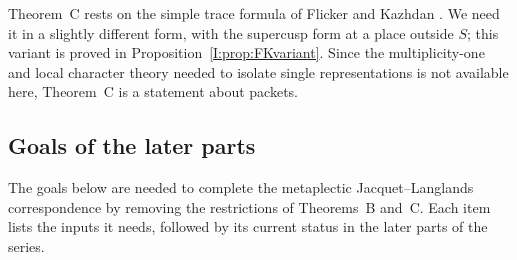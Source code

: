 Theorem~C rests on the simple trace formula of Flicker and Kazhdan \cite[\S18]{FK86}. We need it in a slightly different form, with the supercusp form at a place outside $S$; this variant is proved in Proposition~\ref{I:prop:FKvariant}. Since the multiplicity-one and local character theory needed to isolate single representations is not available here, Theorem~C is a statement about packets.

\subsection{Goals of the later parts}\label{I:subsec:partII}
The goals below are needed to complete the metaplectic Jacquet--Langlands correspondence by removing the restrictions of Theorems~B and~C. Each item lists the inputs it needs, followed by its current status in the later parts of the series.
